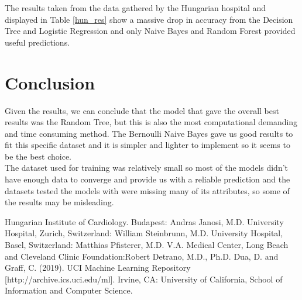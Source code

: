 \documentclass[conference]{IEEEtran}
\begin{document}
The results taken from the data gathered by the Hungarian hospital\cite{hun} and displayed in Table \ref{hun_res} show a massive drop in accuracy from the Decision Tree and Logistic Regression and only Naive Bayes and Random Forest provided useful predictions.

\section{Conclusion}

Given the results, we can conclude that the model that gave the overall best results was the Random Tree, but this is also the most computational demanding and time consuming method. The Bernoulli Naive Bayes gave us good results to fit this specific dataset and it is simpler and lighter to implement so it seems to be the best choice.
\\The dataset used for training was relatively small so most of the models didn't have enough data to converge and provide us with a reliable prediction and the datasets tested the models with were missing many of its attributes, so some of the results may be misleading.

\begin{thebibliography}{00}
     Hungarian Institute of Cardiology. Budapest: Andras Janosi, M.D.
     University Hospital, Zurich, Switzerland: William Steinbrunn, M.D.
     University Hospital, Basel, Switzerland: Matthias Pfisterer, M.D.
     V.A. Medical Center, Long Beach and Cleveland Clinic Foundation:Robert Detrano, M.D., Ph.D.
     Dua, D. and Graff, C. (2019). UCI Machine Learning Repository [http://archive.ics.uci.edu/ml]. Irvine, CA: University of California, School of Information and Computer Science.
\end{thebibliography}
\end{document}
